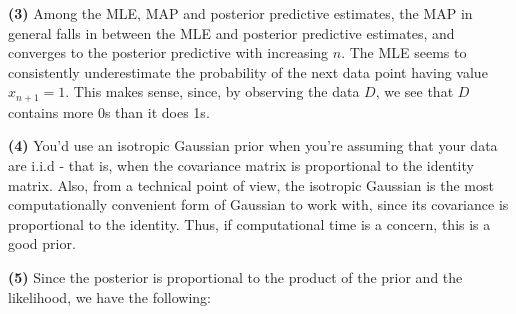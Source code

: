 \documentclass[submit]{harvardml}
\begin{document}
\bigskip

\noindent\textbf{(3)} Among the MLE, MAP and posterior predictive estimates, the MAP in general falls in between the MLE and posterior predictive estimates, and converges to the posterior predictive with increasing $n$. The MLE seems to consistently underestimate the probability of the next data point having value $x_{n+1} = 1$. This makes sense, since, by observing the data $D$, we see that $D$ contains more 0s than it does 1s.

\bigskip

\noindent\textbf{(4)} You'd use an isotropic Gaussian prior when you're assuming that your data are i.i.d - that is, when the covariance matrix is proportional to the identity matrix. Also, from a technical point of view, the isotropic Gaussian is the most computationally convenient form of Gaussian to work with, since its covariance is proportional to the identity. Thus, if computational time is a concern, this is a good prior.

\bigskip

\noindent\textbf{(5)} Since the posterior is proportional to the product of the prior and the likelihood, we have the following:
\end{document}
